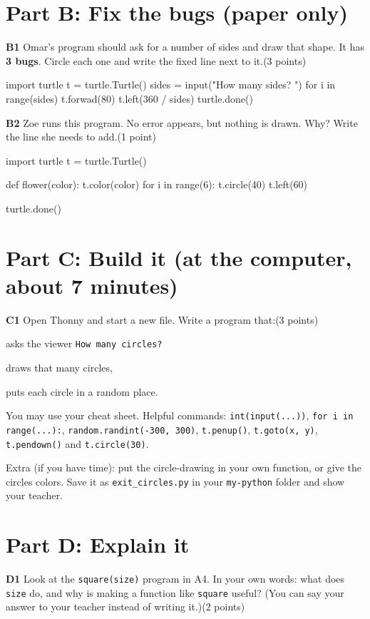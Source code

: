\documentclass[level=1]{kidscode}
\newcommand{\qnum}[1]{\textbf{\color{kcaccent}#1}\quad}
\newcommand{\pts}[1]{\hfill{\small(#1)}}
\begin{document}
\section{Part B: Fix the bugs (paper only)}
\qnum{B1} Omar's program should ask for a number of sides and draw that shape.
It has \textbf{3 bugs}. Circle each one and write the fixed line next to it.\pts{3 points}
\begin{pycode}
import turtle
t = turtle.Turtle()
sides = input("How many sides? ")
for i in range(sides)
    t.forwad(80)
    t.left(360 / sides)
turtle.done()
\end{pycode}

\qnum{B2} Zoe runs this program. No error appears, but nothing is drawn. Why? Write the line she needs to add.\pts{1 point}
\begin{pycode}
import turtle
t = turtle.Turtle()

def flower(color):
    t.color(color)
    for i in range(6):
        t.circle(40)
        t.left(60)

turtle.done()
\end{pycode}

\section{Part C: Build it (at the computer, about 7 minutes)}
\qnum{C1} Open Thonny and start a new file. Write a program that:\pts{3 points}
\begin{checklist}
  \item asks the viewer \texttt{How many circles?}
  \item draws that many circles,
  \item puts each circle in a random place.
\end{checklist}
You may use your cheat sheet. Helpful commands: \texttt{int(input(...))}, \texttt{for i in range(...):},
\texttt{random.randint(-300, 300)}, \texttt{t.penup()}, \texttt{t.goto(x, y)}, \texttt{t.pendown()} and \texttt{t.circle(30)}.\par
Extra (if you have time): put the circle-drawing in your own function, or give the circles colors.
Save it as \texttt{exit\_circles.py} in your \texttt{my-python} folder and show your teacher.

\section{Part D: Explain it}
\qnum{D1} Look at the \texttt{square(size)} program in A4. In your own words: what does \texttt{size} do,
and why is making a function like \texttt{square} useful? (You can say your answer to your teacher instead of writing it.)\pts{2 points}
\end{document}
